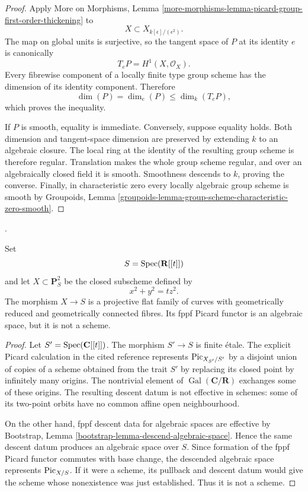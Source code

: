 \begin{proof}
Apply More on Morphisms, Lemma
\ref{more-morphisms-lemma-picard-group-first-order-thickening} to
$$
X\subset X_{k[\epsilon]/(\epsilon^2)}.
$$
The map on global units is surjective, so the tangent space of $P$ at its
identity $e$ is canonically
$$
T_eP=H^1(X,\mathcal O_X).
$$
Every fibrewise component of a locally finite type group scheme has the
dimension of its identity component. Therefore
$$
\dim(P)=\dim_e(P)\leq\dim_k(T_eP),
$$
which proves the inequality.

If $P$ is smooth, equality is immediate. Conversely, suppose equality holds.
Both dimension and tangent-space dimension are preserved by extending $k$ to
an algebraic closure. The local ring at the identity of the resulting group
scheme is therefore regular. Translation makes the whole group scheme
regular, and over an algebraically closed field it is smooth. Smoothness
descends to $k$, proving the converse. Finally, in characteristic zero every
locally algebraic group scheme is smooth by Groupoids, Lemma
\ref{groupoids-lemma-group-scheme-characteristic-zero-smooth}.
\end{proof}

\begin{example}
\label{example-picard-conic-not-scheme}
\begin{reference}
\cite[Expos\'e 236, Section 0(a), p. 221]{FGA}.
\end{reference}
Set
$$
S = \mathop{\mathrm{Spec}}(\mathbf{R}[[t]])
$$
and let $X \subset \mathbf{P}^2_S$ be the closed subscheme defined by
\begin{equation}
\label{equation-picard-conic-not-scheme}
x^2 + y^2 = tz^2.
\end{equation}
The morphism $X \to S$ is a projective flat family of curves with
geometrically reduced and geometrically connected fibres. Its fppf Picard
functor is an algebraic space, but it is not a scheme.
\end{example}

\begin{proof}
Let $S' = \mathop{\mathrm{Spec}}(\mathbf{C}[[t]])$. The morphism $S' \to S$ is finite
\'etale. The explicit Picard calculation in the cited reference represents
$\mathrm{Pic}_{X_{S'}/S'}$ by a disjoint union of copies of a scheme
obtained from the trait $S'$ by replacing its closed point by infinitely
many origins. The nontrivial element of
$\operatorname{Gal}(\mathbf{C}/\mathbf{R})$ exchanges some of these origins.
The resulting descent datum is not effective in schemes: some of its
two-point orbits have no common affine open neighbourhood.

On the other hand, fppf descent data for algebraic spaces are effective by
Bootstrap, Lemma \ref{bootstrap-lemma-descend-algebraic-space}. Hence the
same descent datum produces an algebraic space over $S$. Since formation of
the fppf Picard functor commutes with base change, the descended algebraic
space represents $\mathrm{Pic}_{X/S}$. If it were a scheme, its pullback
and descent datum would give the scheme whose nonexistence was just
established. Thus it is not a scheme.
\end{proof}

